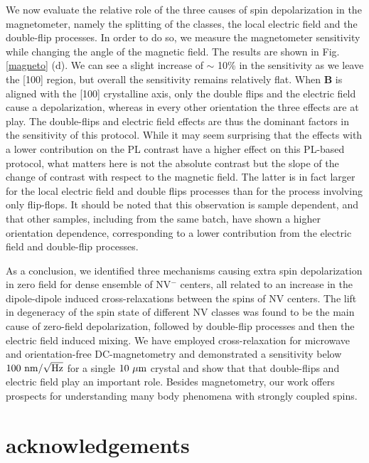 \documentclass[preprintnumbers,amsmath,amssymb,superscriptaddress,twocolumn,showpacs]{revtex4-2}
\begin{document}
We now evaluate the relative role of the three causes of spin depolarization in the magnetometer, namely the splitting of the classes, the local electric field and the double-flip processes. In order to do so, we measure the magnetometer sensitivity while changing the angle of the magnetic field.  The results are shown in Fig. \ref{magneto} (d). We can see a slight increase of $\sim$ 10\% in the sensitivity as we leave the [100] region, but overall the sensitivity remains relatively flat. 
When $\bm B$ is aligned with the [100] crystalline axis, only the double flips and the electric field cause a depolarization, whereas in every other orientation the three effects are at play.
The double-flips and electric field effects are thus the dominant factors in the sensitivity of this protocol. While it may seem surprising that the effects with a lower contribution on the PL contrast have a higher effect on this PL-based protocol, what matters here is not the absolute contrast but the slope of the change of contrast with respect to the magnetic field. The latter is in fact larger for the local electric field and double flips processes than for the process involving only flip-flops. 
It should be noted that this observation is sample dependent, and that other samples, including from the same batch, have shown a higher orientation dependence, corresponding to a lower contribution from the electric field and double-flip processes.

As a conclusion, we identified three mechanisms causing extra spin depolarization in zero field for dense ensemble of NV$^-$ centers, all related to an increase in the dipole-dipole induced cross-relaxations between the spins of NV centers. The lift in degeneracy of the spin state of different NV classes was found to be the main cause of zero-field depolarization, followed by double-flip processes and then the electric field induced mixing. We have employed cross-relaxation for microwave and orientation-free DC-magnetometry and demonstrated a sensitivity below $100\ \rm{nm}/\sqrt{\rm Hz}$ for a single $10\ \mu \rm m$ crystal and show that that double-flips and electric field play an important role.
Besides magnetometry, our work offers prospects for understanding many body phenomena with strongly coupled spins. 

\section*{acknowledgements}


{}
\end{document}
